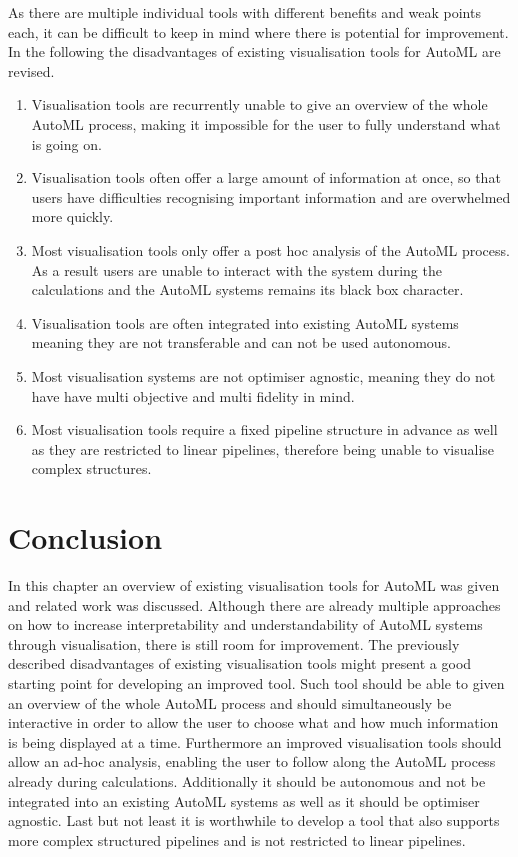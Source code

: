 As there are multiple individual tools with different benefits and weak points each, it can be difficult to keep in mind where there is potential for improvement. In the following the disadvantages of existing visualisation tools for AutoML are revised. 
\begin{enumerate}
    \item Visualisation tools are recurrently unable to give an overview of the whole AutoML process, making it impossible for the user to fully understand what is going on.
    \item Visualisation tools often offer a large amount of information at once, so that users have difficulties recognising important information and are overwhelmed more quickly. 
    \item Most visualisation tools only offer a post hoc analysis of the AutoML process. As a result users are unable to interact with the system during the calculations and the AutoML systems remains its black box character.
    \item Visualisation tools are often integrated into existing AutoML systems meaning they are not transferable and can not be used autonomous.
    \item Most visualisation systems are not optimiser agnostic, meaning they do not have have multi objective and multi fidelity in mind.
    \item Most visualisation tools require a fixed pipeline structure in advance as well as they are restricted to linear pipelines, therefore being unable to visualise complex structures.
\end{enumerate}

\section{Conclusion}
\label{sec:related:conclusion}

In this chapter an overview of existing visualisation tools for AutoML was given and related work was discussed. Although there are already multiple approaches on how to increase interpretability and understandability of AutoML systems through visualisation, there is still room for improvement. The previously described disadvantages of existing visualisation tools might present a good starting point for developing an improved tool. Such tool should be able to given an overview of the whole AutoML process and should simultaneously be interactive in order to allow the user to choose what and how much information is being displayed at a time. Furthermore an improved visualisation tools should allow an ad-hoc analysis, enabling the user to follow along the AutoML process already during calculations. Additionally it should be autonomous and not be integrated into an existing AutoML systems as well as it should be optimiser agnostic. Last but not least it is worthwhile to develop a tool that also supports more complex structured pipelines and is not restricted to linear pipelines.